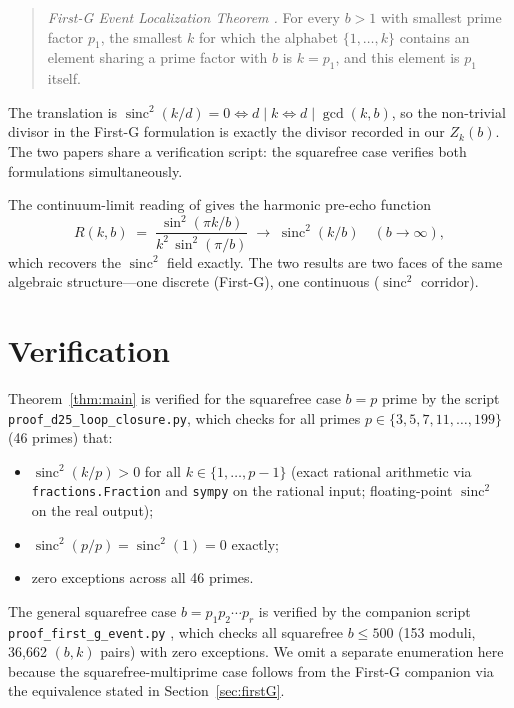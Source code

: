 \documentclass[11pt,reqno]{amsart}
\theoremstyle{plain}
\theoremstyle{remark}
\DeclareMathOperator{\sinc}{sinc}
\begin{document}
\begin{quote}
\emph{First-G Event Localization Theorem \cite{J41}.} For every
$b > 1$ with smallest prime factor $p_1$, the smallest $k$ for
which the alphabet $\{1, \ldots, k\}$ contains an element sharing
a prime factor with $b$ is $k = p_1$, and this element is $p_1$
itself.
\end{quote}

The translation is
$\sinc^2(k/d) = 0 \iff d \mid k \iff d \mid \gcd(k, b)$, so the
non-trivial divisor in the First-G formulation is exactly the
divisor recorded in our $Z_k(b)$. The two papers share a
verification script: the squarefree case verifies both
formulations simultaneously.

The continuum-limit reading of \cite{J41} gives the harmonic
pre-echo function
\begin{equation}\label{eq:R}
  R(k, b) \;=\; \frac{\sin^2(\pi k / b)}{k^2 \, \sin^2(\pi/b)}
  \;\longrightarrow\; \sinc^2(k/b) \quad (b \to \infty),
\end{equation}
which recovers the $\sinc^2$ field exactly. The two results are
two faces of the same algebraic structure---one discrete (First-G),
one continuous ($\sinc^2$ corridor).

\section{Verification}\label{sec:verify}

Theorem~\ref{thm:main} is verified for the squarefree case
$b = p$ prime by the script
\texttt{proof\_d25\_loop\_closure.py}, which checks for all primes
$p \in \{3, 5, 7, 11, \ldots, 199\}$ (46 primes) that:
\begin{itemize}\setlength\itemsep{1pt}
  \item $\sinc^2(k/p) > 0$ for all $k \in \{1, \ldots, p-1\}$
        (exact rational arithmetic via \texttt{fractions.Fraction}
        and \texttt{sympy} on the rational input; floating-point
        $\sinc^2$ on the real output);
  \item $\sinc^2(p/p) = \sinc^2(1) = 0$ exactly;
  \item zero exceptions across all 46 primes.
\end{itemize}
The general squarefree case $b = p_1 p_2 \cdots p_r$ is verified by
the companion script \texttt{proof\_first\_g\_event.py}
\cite{J04proof}, which checks all squarefree $b \le 500$ (153
moduli, 36{,}662 $(b, k)$ pairs) with zero exceptions. We omit a
separate enumeration here because the squarefree-multiprime case
follows from the First-G companion via the equivalence stated in
Section~\ref{sec:firstG}.
\end{document}
